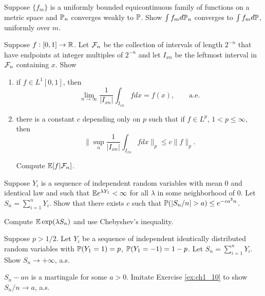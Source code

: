 \begin{exercise}\label{ex:ch1_15}
Suppose $\{f_m\}$ is a uniformly bounded equicontinuous family of functions on a metric space and $\P_n$ converges weakly to $\P$. Show $\int f_m d\P_n$ converges to $\int f_m d\P$, uniformly over $m$.
\end{exercise}

\begin{exercise}\label{ex:ch1_16}
Suppose $f : [0,1] \to \R$. Let $\FC_n$ be the collection of intervals of length $2^{-n}$ that have endpoints at integer multiples of $2^{-n}$ and let $I_{xn}$ be the leftmost interval in $\FC_n$ containing $x$. Show
\mpagebreak
\begin{enumerate}
    \item if $f \in L^1[0,1]$, then
    \[
        \lim_{n\to\infty} \frac{1}{|I_{xn}|} \int_{I_{xn}} f dx = f(x), \qquad \text{a.e.}
    \]

    \item there is a constant $c$ depending only on $p$ such that if $f \in L^p$, $1 < p \leq \infty$, then
    \[
        \Big\|\sup_n \frac{1}{|I_{xn}|} \int_{I_{xn}} f dx\Big\|_p \leq c\|f\|_p.
    \]

    \hint Compute $\E[f\mid \FC_n]$.
\end{enumerate}
\end{exercise}

\begin{exercise}\label{ex:ch1_17}
Suppose $Y_i$ is a sequence of independent random variables with mean $0$ and identical law and such that $\E e^{\lambda Y_1} < \infty$ for all $\lambda$ in some neighborhood of $0$. Let $S_n = \sum_{i=1}^n Y_i$. Show that there exists $c$ such that $\P(|S_n/n| > a) \leq e^{-ca^2n}$.

\hint Compute $\E \exp(\lambda S_n)$ and use Chebyshev's inequality.
\end{exercise}

\begin{exercise}\label{ex:ch1_18}
Suppose $p > 1/2$. Let $Y_i$ be a sequence of independent identically distributed random variables with $\P(Y_1 = 1) = p$, $\P(Y_1 = -1) = 1-p$. Let $S_n = \sum_{i=1}^n Y_i$. Show $S_n \to +\infty$, a.s.

\hint $S_n - an$ is a martingale for some $a > 0$. Imitate Exercise \ref{ex:ch1_10} to show $S_n/n \to a$, a.s.
\end{exercise}

